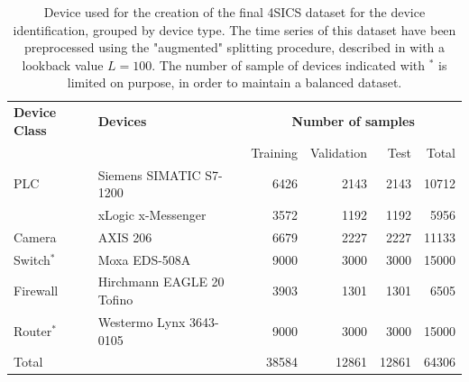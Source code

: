 \begin{table}[h]
\centering
\begin{tabular}{llrrrr}
\toprule
\textbf{Device Class} & \textbf{Devices} & \multicolumn{4}{c}{\textbf{Number of samples}} \\
& & Training & Validation & Test & Total \\
\midrule
\multirow{1}{*}{PLC} & Siemens SIMATIC S7-1200 & 6426 & 2143 & 2143 & 10712  \\
                     & xLogic x-Messenger & 3572 & 1192 & 1192 & 5956  \\
\midrule
\multirow{1}{*}{Camera}  & AXIS 206 & 6679 & 2227 & 2227 & 11133 \\
\midrule
\multirow{1}{*}{Switch$^*$} & Moxa EDS-508A  & 9000 & 3000 & 3000 & 15000 \\
\midrule
\multirow{1}{*}{Firewall}& Hirchmann EAGLE 20 Tofino & 3903 & 1301 & 1301 & 6505 \\
\midrule
\multirow{1}{*}{Router$^*$} & Westermo Lynx 3643-0105  & 9000 & 3000 & 3000 & 15000  \\ 
\midrule
\midrule
Total & & 38584 & 12861 & 12861 & 64306 \\
\bottomrule
\end{tabular}
\caption{Device used for the creation of the final 4SICS dataset for the device identification, grouped by device type. The time series of this dataset have been preprocessed using the "augmented" splitting procedure, described in  with a lookback value $L=100$. The number of sample of devices indicated with $^*$ is limited on purpose, in order to maintain a balanced dataset.}
\label{tab:4sicsdev}
\end{table}



